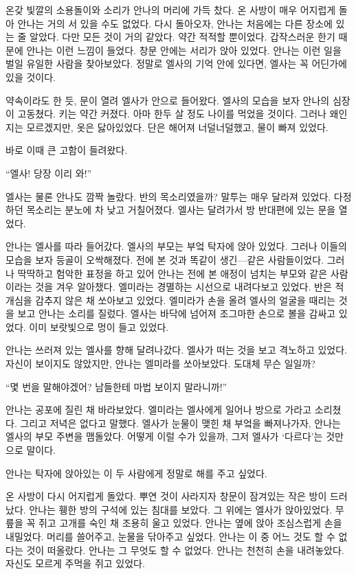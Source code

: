 온갖 빛깔의 소용돌이와 소리가 안나의 머리에 가득 찼다. 온 사방이 매우 어지럽게 돌아 안나는 거의 서 있을 수도 없었다. 다시 돌아오자, 안나는 처음에는 다른 장소에 있는 줄 알았다. 다만 모든 것이 거의 같았다. 약간 적적할 뿐이었다. 갑작스러운 한기 때문에 안나는 이런 느낌이 들었다. 창문 안에는 서리가 앉아 있었다. 안나는 이런 일을 벌일 유일한 사람을 찾아보았다. 정말로 엘사의 기억 안에 있다면, 엘사는 꼭 어딘가에 있을 것이다.

약속이라도 한 듯, 문이 열려 엘사가 안으로 들어왔다. 엘사의 모습을 보자 안나의 심장이 고동쳤다. 키는 약간 커졌다. 아마 한두 살 정도 나이를 먹었을 것이다. 그러나 왜인지는 모르겠지만, 옷은 닳아있었다. 단은 해어져 너덜너덜했고, 물이 빠져 있었다.

바로 이때 큰 고함이 들려왔다.

``엘사! 당장 이리 와!''

엘사는 물론 안나도 깜짝 놀랐다. 반의 목소리였을까? 말투는 매우 달라져 있었다. 다정하던 목소리는 분노에 차 낮고 거칠어졌다. 엘사는 달려가서 방 반대편에 있는 문을 열었다. 

안나는 엘사를 따라 들어갔다. 엘사의 부모는 부엌 탁자에 앉아 있었다. 그러나 이들의 모습을 보자 등골이 오싹해졌다. 전에 본 것과 똑같이 생긴—같은 사람들이었다. 그러나 딱딱하고 험악한 표정을 하고 있어 안나는 전에 본 애정이 넘치는 부모와 같은 사람이라는 것을 겨우 알아챘다. 엘미라는 경멸하는 시선으로 내려다보고 있었다. 반은 적개심을 감추지 않은 채 쏘아보고 있었다. 엘미라가 손을 올려 엘사의 얼굴을 때리는 것을 보고 안나는 소리를 질렀다. 엘사는 바닥에 넘어져 조그마한 손으로 볼을 감싸고 있었다. 이미 보랏빛으로 멍이 들고 있었다.

안나는 쓰러져 있는 엘사를 향해 달려나갔다. 엘사가 떠는 것을 보고 격노하고 있었다. 자신이 보이지도 않았지만, 안나는 엘미라를 쏘아보았다. 도대체 무슨 일일까?

``몇 번을 말해야겠어? 남들한테 마법 보이지 말라니까!''

안나는 공포에 질린 채 바라보았다. 엘미라는 엘사에게 일어나 방으로 가라고 소리쳤다. 그리고 저녁은 없다고 말했다. 엘사가 눈물이 맺힌 채 부엌을 빠져나가자, 안나는 엘사의 부모 주변을 맴돌았다. 어떻게 이럴 수가 있을까, 그저 엘사가 `다르다'는 것만으로 말이다.

안나는 탁자에 앉아있는 이 두 사람에게 정말로 해를 주고 싶었다.

온 사방이 다시 어지럽게 돌았다. 뿌연 것이 사라지자 창문이 잠겨있는 작은 방이 드러났다. 안나는 휑한 방의 구석에 있는 침대를 보았다. 그 위에는 엘사가 앉아있었다. 무릎을 꼭 쥐고 고개를 숙인 채 조용히 울고 있었다. 안나는 옆에 앉아 조심스럽게 손을 내밀었다. 머리를 쓸어주고, 눈물을 닦아주고 싶었다. 안나는 이 중 어느 것도 할 수 없다는 것이 떠올랐다. 안나는 그 무엇도 할 수 없었다. 안나는 천천히 손을 내려놓았다. 자신도 모르게 주먹을 쥐고 있었다.

